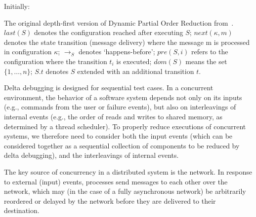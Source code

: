 \begin{algorithm*}[htb!]
{\footnotesize
\begin{algorithmic}
\State Initially: 
\Else
{}
\EndIf
\EndIf
\EndFor

\EndWhile
\EndIf

\EndProcedure
\end{algorithmic}
}
\caption{{\label{alg:dpor} The original depth-first version of Dynamic Partial Order Reduction
from~\cite{flanagan2005dynamic}. $last(S)$ denotes the configuration reached
after executing $S$;
$next(\kappa,m)$ denotes the state transition (message delivery) where the message m is
processed in configuration $\kappa$; $\rightarrow_S$ denotes `happens-before';
$pre(S,i)$ refers to the configuration where the transition $t_i$ is executed; $dom(S)$ means the set
$\{1,\dots,n\}$; $S.t$ denotes
$S$ extended with an additional transition $t$.}}
\end{algorithm*}

Delta debugging is designed for sequential test cases. In a concurrent environment, the behavior of a software system depends not only on
its inputs (e.g., commands from the user or failure events), but also on
interleavings of internal events (e.g., the order of reads and writes to
shared memory, as determined by a thread scheduler). To properly reduce
executions of concurrent systems, we therefore need to consider both the input
events (which can be considered together as a sequential collection of
components to be reduced by delta debugging), and the interleavings of internal events.

The key source of
concurrency in a distributed system is the network. In response to external
(input) events, processes send messages to each other over the network, which may (in the case of a
fully asynchronous network) be arbitrarily
reordered or delayed by the network before they are delivered to their
destination.

